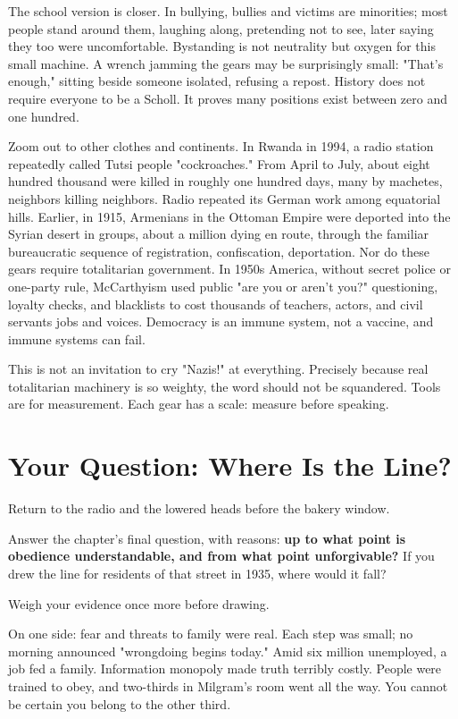 The school version is closer. In bullying, bullies and victims are minorities; most people stand around them, laughing along, pretending not to see, later saying they too were uncomfortable. Bystanding is not neutrality but oxygen for this small machine. A wrench jamming the gears may be surprisingly small: "That's enough," sitting beside someone isolated, refusing a repost. History does not require everyone to be a Scholl. It proves many positions exist between zero and one hundred.

Zoom out to other clothes and continents. In Rwanda in 1994, a radio station repeatedly called Tutsi people "cockroaches." From April to July, about eight hundred thousand were killed in roughly one hundred days, many by machetes, neighbors killing neighbors. Radio repeated its German work among equatorial hills. Earlier, in 1915, Armenians in the Ottoman Empire were deported into the Syrian desert in groups, about a million dying en route, through the familiar bureaucratic sequence of registration, confiscation, deportation. Nor do these gears require totalitarian government. In 1950s America, without secret police or one-party rule, McCarthyism used public "are you or aren't you?" questioning, loyalty checks, and blacklists to cost thousands of teachers, actors, and civil servants jobs and voices. Democracy is an immune system, not a vaccine, and immune systems can fail.

This is not an invitation to cry "Nazis!" at everything. Precisely because real totalitarian machinery is so weighty, the word should not be squandered. Tools are for measurement. Each gear has a scale: measure before speaking.

\section{Your Question: Where Is the Line?}
Return to the radio and the lowered heads before the bakery window.

Answer the chapter's final question, with reasons: \textbf{up to what point is obedience understandable, and from what point unforgivable?} If you drew the line for residents of that street in 1935, where would it fall?

Weigh your evidence once more before drawing.

On one side: fear and threats to family were real. Each step was small; no morning announced "wrongdoing begins today." Amid six million unemployed, a job fed a family. Information monopoly made truth terribly costly. People were trained to obey, and two-thirds in Milgram's room went all the way. You cannot be certain you belong to the other third.

